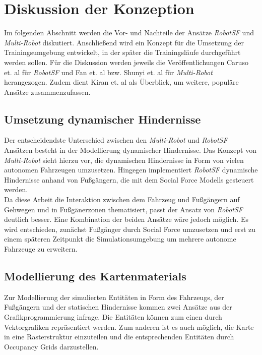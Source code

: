 
\section{Diskussion der Konzeption}
Im folgenden Abschnitt werden die Vor- und Nachteile der Ansätze \emph{RobotSF} und
\emph{Multi-Robot} diskutiert. Anschließend wird ein Konzept für die Umsetzung der
Trainingsumgebung entwickelt, in der später die Trainingsläufe durchgeführt werden sollen.
Für die Diskussion werden jeweils die Veröffentlichungen Caruso et. al \cite{machines11020268}
für \emph{RobotSF} und Fan et. al \cite{fan2020distributed} bzw. Shunyi et. al
\cite{Shunyi2020multirobot2} für \emph{Multi-Robot} herangezogen. Zudem dient Kiran et. al
\cite{Kiran2022survey} als Überblick, um weitere, populäre Ansätze zusammenzufassen.

\subsection{Umsetzung dynamischer Hindernisse}
Der entscheidendste Unterschied zwischen den \emph{Multi-Robot} und \emph{RobotSF} Ansätzen
besteht in der Modellierung dynamischer Hindernisse. Das Konzept von \emph{Multi-Robot} sieht
hierzu vor, die dynamischen Hindernisse in Form von vielen autonomen Fahrzeugen umzusetzen.
Hingegen implementiert \emph{RobotSF} dynamische Hindernisse anhand von Fußgängern, die mit
dem Social Force Modells gesteuert werden.\\

Da diese Arbeit die Interaktion zwischen dem Fahrzeug und Fußgängern auf Gehwegen und in
Fußgänerzonen thematisiert, passt der Ansatz von \emph{RobotSF} deutlich besser.
Eine Kombination der beiden Ansätze wäre jedoch möglich. Es wird entschieden, zunächst Fußgänger
durch Social Force umzusetzen und erst zu einem späteren Zeitpunkt die Simulationsumgebung
um mehrere autonome Fahrzeuge zu erweitern.

\subsection{Modellierung des Kartenmaterials}
Zur Modellierung der simulierten Entitäten in Form des Fahrzeugs, der Fußgängern und
der statischen Hindernisse kommen zwei Ansätze aus der Grafikprogrammierung infrage.
Die Entitäten können zum einen durch Vektorgrafiken repräsentiert werden. Zum anderen
ist es auch möglich, die Karte in eine Rasterstruktur einzuteilen und die entsprechenden
Entitäten durch Occupancy Grids darzustellen.\\

